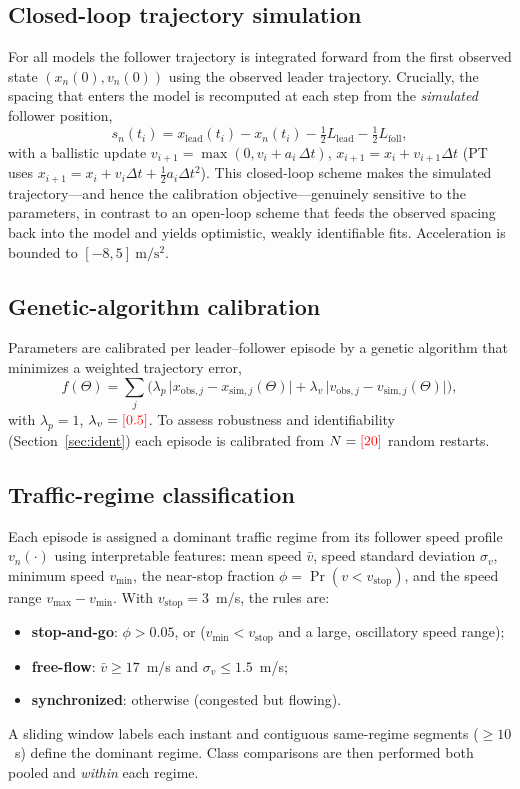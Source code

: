 \documentclass[11pt]{article}
\newcommand{\tbd}[1]{\textcolor{red}{[#1]}}        %
\begin{document}
\subsection{Closed-loop trajectory simulation}
\label{sec:closedloop}
For all models the follower trajectory is integrated forward from the first
observed state $(x_n(0),v_n(0))$ using the observed leader trajectory. Crucially,
the spacing that enters the model is recomputed at each step from the
\emph{simulated} follower position,
\begin{equation}
s_n(t_i)=x_{\mathrm{lead}}(t_i)-x_n(t_i)-\tfrac12 L_{\mathrm{lead}}
-\tfrac12 L_{\mathrm{foll}},
\label{eq:closedloop}
\end{equation}
with a ballistic update $v_{i+1}=\max(0,v_i+a_i\,\Delta t)$,
$x_{i+1}=x_i+v_{i+1}\Delta t$ (PT uses
$x_{i+1}=x_i+v_i\Delta t+\tfrac12 a_i\Delta t^2$). This closed-loop scheme makes
the simulated trajectory---and hence the calibration objective---genuinely
sensitive to the parameters, in contrast to an open-loop scheme that feeds the
observed spacing back into the model and yields optimistic, weakly identifiable
fits. Acceleration is bounded to $[-8,5]~\mathrm{m/s^2}$.

\subsection{Genetic-algorithm calibration}
Parameters are calibrated per leader--follower episode by a genetic algorithm
that minimizes a weighted trajectory error,
\begin{equation}
f(\Theta)=\sum_{j}\Big(\lambda_p\,\big|x_{\mathrm{obs},j}-x_{\mathrm{sim},j}(\Theta)\big|
+\lambda_v\,\big|v_{\mathrm{obs},j}-v_{\mathrm{sim},j}(\Theta)\big|\Big),
\label{eq:fitness}
\end{equation}
with $\lambda_p=1$, $\lambda_v=\tbd{0.5}$. To assess robustness and
identifiability (Section~\ref{sec:ident}) each episode is calibrated from
$N=\tbd{20}$ random restarts.

\subsection{Traffic-regime classification}
\label{sec:regime}
Each episode is assigned a dominant traffic regime from its follower speed
profile $v_n(\cdot)$ using interpretable features: mean speed $\bar v$, speed
standard deviation $\sigma_v$, minimum speed $v_{\min}$, the near-stop fraction
$\phi=\Pr(v<v_{\mathrm{stop}})$, and the speed range $v_{\max}-v_{\min}$. With
$v_{\mathrm{stop}}=3$~m/s, the rules are:
\begin{itemize}
\item \textbf{stop-and-go}: $\phi>0.05$, or ($v_{\min}<v_{\mathrm{stop}}$ and a
large, oscillatory speed range);
\item \textbf{free-flow}: $\bar v\ge 17$~m/s and $\sigma_v\le1.5$~m/s;
\item \textbf{synchronized}: otherwise (congested but flowing).
\end{itemize}
A sliding window labels each instant and contiguous same-regime segments
($\ge10$~s) define the dominant regime. Class comparisons are then performed both
pooled and \emph{within} each regime.
\end{document}
